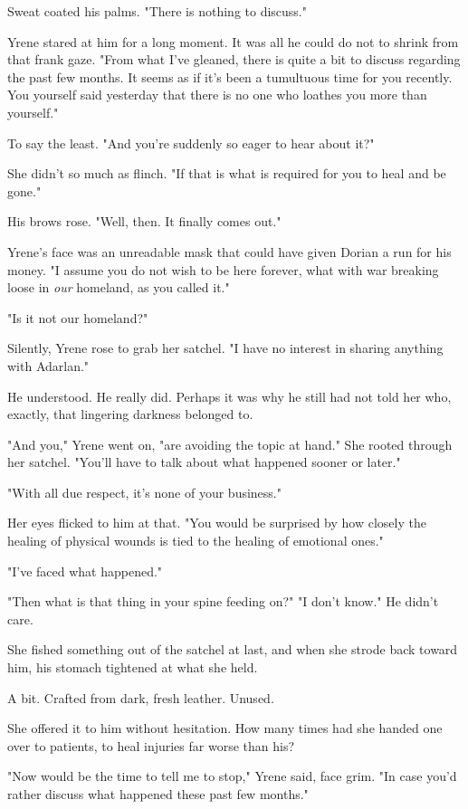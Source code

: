 Sweat coated his palms.
"There is nothing to discuss."

Yrene stared at him for a long moment.
It was all he could do not to shrink from that frank gaze.
"From what I've gleaned, there is quite a bit to discuss regarding the past few months.
It seems as if it's been a  tumultuous time for you recently.
You yourself said yesterday that there is no one who loathes you more than yourself."

To say the least.
"And you're suddenly so eager to hear about it?"

She didn't so much as flinch.
"If that is what is required for you to heal and be gone."

His brows rose.
"Well, then.
It finally comes out."

Yrene's face was an unreadable mask that could have given Dorian a run for his money.
"I assume you do not wish to be here forever, what with war breaking loose in \emph{our} homeland, as you called it."

"Is it not our homeland?"

Silently, Yrene rose to grab her satchel.
"I have no interest in sharing anything with Adarlan."

He understood.
He really did.
Perhaps it was why he still had not told her who, exactly, that lingering darkness belonged to.

"And you," Yrene went on, "are avoiding the topic at hand."
She rooted through her satchel.
"You'll have to talk about what happened sooner or later."

"With all due respect, it's none of your business."

Her eyes flicked to him at that.
"You would be surprised by how closely the healing of physical wounds is tied to the healing of emotional ones."

"I've faced what happened."

"Then what is that thing in your spine feeding on?"
"I don't know."
He didn't care.

She fished something out of the satchel at last, and when she strode back toward him, his stomach tightened at what she held.

A bit.
Crafted from dark, fresh leather.
Unused.

She offered it to him without hesitation.
How many times had she handed one over to patients, to heal injuries far worse than his?

"Now would be the time to tell me to stop," Yrene said, face grim.
"In case you'd rather discuss what happened these past few months."

